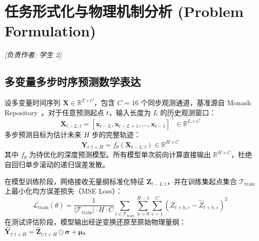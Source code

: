 \documentclass[11pt,a4paper,UTF8]{ctexart}
\begin{document}
\section{任务形式化与物理机制分析 (Problem Formulation)}
\label{sec:formulation}
\noindent\textit{[负责作者: 学生 2]}

\subsection{多变量多步时序预测数学表达}
设多变量时间序列 $\mathbf{X} \in \mathbb{R}^{T \times C}$，包含 $C=16$ 个同步观测通道，基准源自 Monash Repository~\cite{godahewa2021monash}。对于任意预测起点 $t$，输入长度为 $L$ 的历史观测窗口：
\begin{equation}
    \mathbf{X}_{t-L:t} = \left[ \mathbf{x}_{t-L}, \mathbf{x}_{t-L+1}, \dots, \mathbf{x}_{t-1} \right]^\top \in \mathbb{R}^{L \times C}
\end{equation}
多步预测目标为估计未来 $H$ 步的完整轨迹：
\begin{equation}
    \hat{\mathbf{Y}}_{t:t+H} = f_\theta\left(\mathbf{X}_{t-L:t}\right) \in \mathbb{R}^{H \times C}
\end{equation}
其中 $f_\theta$ 为待优化的深度预测模型。所有模型单次前向计算直接输出 $\mathbb{R}^{H \times C}$，杜绝自回归单步滚动的递归误差发散。

在模型训练阶段，网络接收无量纲标准化特征 $\mathbf{Z}_{t-L:t}$，并在训练集起点集合 $\mathcal{T}_{\text{train}}$ 上最小化均方误差损失（MSE Loss）：
\begin{equation}
    \mathcal{L}_{\text{train}}(\theta) = \frac{1}{|\mathcal{T}_{\text{train}}| \cdot H \cdot C} \sum_{t \in \mathcal{T}_{\text{train}}} \sum_{h=0}^{H-1} \sum_{c=1}^C \left( Z_{t+h, c} - \hat{Z}_{t+h, c} \right)^2
\end{equation}
在测试评估阶段，模型输出经逆变换还原至原始物理量纲：$\hat{\mathbf{Y}}_{t:t+H} = \hat{\mathbf{Z}}_{t:t+H} \odot \boldsymbol{\sigma} + \boldsymbol{\mu}$。

\begin{table}[H]
\centering
\small
\caption{基准数据集物理特征与实验窗口配置规范表}
\label{tab:dataset_specs}
\end{table}
\end{document}
